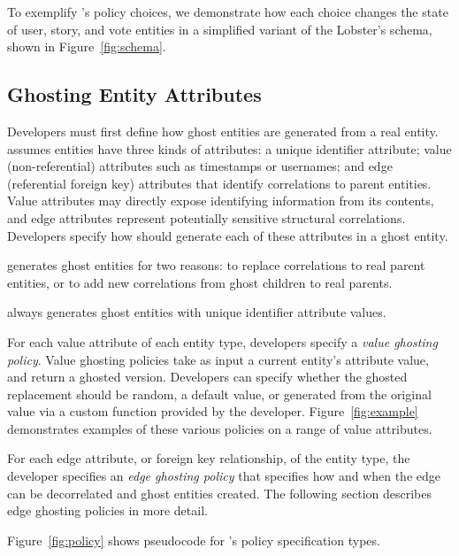 To exemplify \sys's policy choices, we demonstrate how each choice changes the state of user, story,
and vote entities in a simplified variant of the Lobster's schema, shown in Figure~\ref{fig:schema}.

\subsection{Ghosting Entity Attributes}
\label{sec:ghosting}
Developers must first define how ghost entities are generated from a real entity.
\sys assumes entities have three kinds of attributes: a unique identifier attribute; 
value (non-referential) attributes such as timestamps or usernames; and 
edge (referential foreign key) attributes that identify correlations to parent entities. 
Value attributes may directly expose identifying information from its
contents, and edge attributes represent potentially sensitive structural correlations. 
Developers specify how \sys should generate each of these attributes in a ghost entity.

\sys generates ghost entities for two reasons: to replace correlations to real parent entities,
or to add new correlations from ghost children to real parents.

\sys always generates ghost entities with unique identifier attribute values.

For each value attribute of each entity type, developers specify a \emph{value ghosting policy}.
Value ghosting policies take as input a current entity's attribute value, and return a ghosted
version. Developers can specify whether the ghosted replacement should be random, a default value,
or generated from the original value via a custom function provided by the developer.
Figure~\ref{fig:example} demonstrates examples of these various policies on a range of
value attributes.

For each edge attribute, or foreign key relationship, of the entity type, the developer specifies an
\emph{edge ghosting policy} that specifies how and when the edge can be decorrelated and ghost
entities created.  The following section describes edge ghosting policies in more detail.

Figure~\ref{fig:policy} shows pseudocode for \sys's policy specification types.

%

